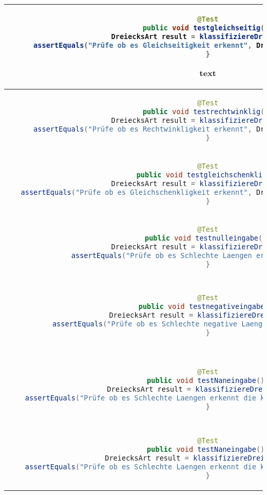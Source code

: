 \begin{parlist}
\begin{center}
\begin{tabular}{ | c | c | }
\begin{lstlisting}[language=java,frame=trBL]
@Test
public void testgleichseitig(){
   DreiecksArt result = klassifiziereDreieck(4,4,4);
   assertEquals("Prüfe ob es Gleichseitigkeit erkennt", DriecksArt.Gliechseitig, result);
}
  \end{lstlisting} text& Need to check if it can recognize equallateral triangles. \\ 
  \hline
  \begin{lstlisting}[language=java,frame=trBL]
@Test
public void testrechtwinklig(){
   DreiecksArt result = klassifiziereDreieck(3,4,5);
   assertEquals("Prüfe ob es Rechtwinkligkeit erkennt", DriecksArt.Rechtwinklig, result);
}
  \end{lstlisting} & Need to check if it can recognize right triangles. \\ 
  \hline
  \begin{lstlisting}[language=java,frame=trBL]
@Test
public void testgleichschenklig(){
   DreiecksArt result = klassifiziereDreieck(4,4,5);
   assertEquals("Prüfe ob es Gleichschenkligkeit erkennt", DriecksArt.Gleichschenklig, result);
}
  \end{lstlisting} &  Need to check if it can recognize isosceles triangles. \\ 
  \hline
  \begin{lstlisting}[language=java,frame=trBL]
@Test
public void testnulleingabe(){
   DreiecksArt result = klassifiziereDreieck(0,4,5);
   assertEquals("Prüfe ob es Schlechte Laengen erkennt", null, result);
}
  \end{lstlisting} &  Need to check if it can recognize invalid lengths. \\ 
 \hline
  \begin{lstlisting}[language=java,frame=trBL]
@Test
public void testnegativeingabe(){
   DreiecksArt result = klassifiziereDreieck(3,-4,5);
   assertEquals("Prüfe ob es Schlechte negative Laengen erkennt", null, result);
}
  \end{lstlisting} &  Need to check if it can recognize invalid lengths that are negative. \\ 
 \hline
\begin{lstlisting}[language=java,frame=trBL]
@Test
public void testNaneingabe(){
   DreiecksArt result = klassifiziereDreieck(3,4,NAN);
   assertEquals("Prüfe ob es Schlechte Laengen erkennt die keine Zahlen sind", null, result);
}
  \end{lstlisting} &  Need to check if it can recognize lengths that are not Numbers. \\ 
 \hline
\begin{lstlisting}[language=java,frame=trBL]
@Test
public void testNaneingabe(){
   DreiecksArt result = klassifiziereDreieck(3,null,5);
   assertEquals("Prüfe ob es Schlechte Laengen erkennt die keine Werte haben", null, result);
}
  \end{lstlisting} &  Need to check if it can recognize lengths that are null. \\ 
\end{tabular}
\end{center}

\end{parlist}
